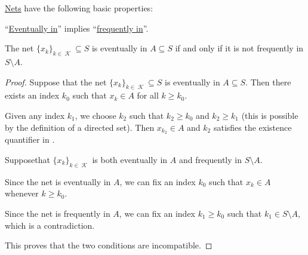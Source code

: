 \begin{proposition}\label{thm:topological_net_properties}
  \hyperref[def:topological_net]{Nets} have the following basic properties:

  \begin{thmenum}
     \enquote{\hyperref[def:topological_net/eventually_in]{Eventually in}} implies \enquote{\hyperref[def:topological_net/frequently_in]{frequently in}}.

     The net \( \{ x_k \}_{k \in \mscrK} \subseteq S \) is eventually in \( A \subseteq S \) if and only if it is not frequently in \( S \setminus A \).
  \end{thmenum}
\end{proposition}
\begin{proof}
   Suppose that the net \( \{ x_k \}_{k \in \mscrK} \subseteq S \) is eventually in \( A \subseteq S \). Then there exists an index \( k_0 \) such that \( x_k \in A \) for all \( k \geq k_0 \).

  Given any index \( k_1 \), we choose \( k_2 \) such that \( k_2 \geq k_0 \) and \( k_2 \geq k_1 \) (this is possible by the definition of a directed set). Then \( x_{k_2} \in A \) and \( k_2 \) satisfies the existence quantifier in .

   Suppose\DNE that \( \{ x_k \}_{k \in \mscrK} \) is both eventually in \( A \) and frequently in \( S \setminus A \).

  Since the net is eventually in \( A \), we can fix an index \( k_0 \) such that \( x_k \in A \) whenever \( k \geq k_0 \).

  Since the net is frequently in \( A \), we can fix an index \( k_1 \geq k_0 \) such that \( k_1 \in S \setminus A \), which is a contradiction.

  This proves that the two conditions are incompatible.
\end{proof}

